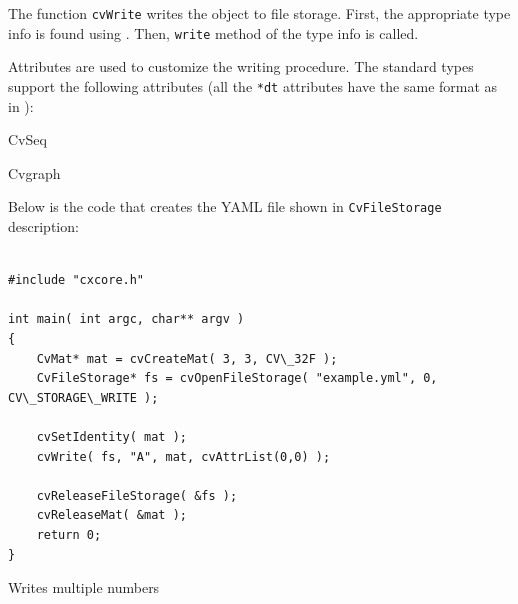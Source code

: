 The function \texttt{cvWrite} writes the object to file storage. First, the appropriate type info is found using . Then, \texttt{write} method of the type info is called.

Attributes are used to customize the writing procedure. The standard types support the following attributes (all the \texttt{*dt} attributes have the same format as in ):

CvSeq
  \begin{description}
  \end{description}
Cvgraph
  \begin{description}
  \end{description}

Below is the code that creates the YAML file shown in \texttt{CvFileStorage} description:

\begin{lstlisting}

#include "cxcore.h"

int main( int argc, char** argv )
{
    CvMat* mat = cvCreateMat( 3, 3, CV\_32F );
    CvFileStorage* fs = cvOpenFileStorage( "example.yml", 0, CV\_STORAGE\_WRITE );

    cvSetIdentity( mat );
    cvWrite( fs, "A", mat, cvAttrList(0,0) );

    cvReleaseFileStorage( &fs );
    cvReleaseMat( &mat );
    return 0;
}

\end{lstlisting}


\label{WriteRawData}

Writes multiple numbers


